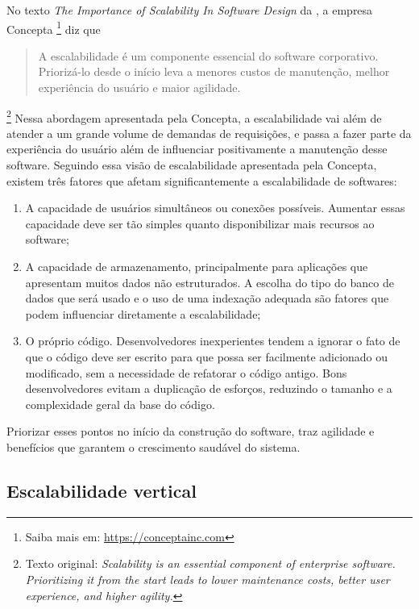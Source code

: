 No texto \textit{The Importance of Scalability In Software Design}
da , a empresa Concepta
\footnote{Saiba mais em: \url{https://conceptainc.com}} diz que \begin{quote}
A escalabilidade é um componente essencial do software corporativo. Priorizá-lo
desde o início leva a menores custos de manutenção, melhor experiência do usuário
e maior agilidade.\end{quote}\footnote{Texto original: \textit{Scalability is an
essential component of enterprise software. Prioritizing it from the start leads
to lower maintenance costs, better user experience, and higher agility.}} Nessa
abordagem apresentada pela Concepta, a escalabilidade vai além de atender a um
grande volume de demandas de requisições, e passa a fazer parte da experiência
do usuário além de influenciar positivamente a manutenção desse software. Seguindo
essa visão de escalabilidade apresentada pela Concepta, existem três fatores que
afetam significantemente a escalabilidade de softwares:

  \begin{enumerate}
    \item A capacidade de usuários simultâneos ou conexões possíveis.
    Aumentar essas capacidade deve ser tão simples quanto disponibilizar mais
    recursos ao software;
    \item A capacidade de armazenamento, principalmente para aplicações
    que apresentam muitos dados não estruturados. A escolha do tipo do banco de
    dados que será usado e o uso de uma indexação adequada são fatores que
    podem influenciar diretamente a escalabilidade;
    \item O próprio código. Desenvolvedores inexperientes tendem a ignorar
    o fato de que o código deve ser escrito para que possa ser facilmente
    adicionado ou modificado, sem a necessidade de refatorar o código antigo.
    Bons desenvolvedores evitam a duplicação de esforços, reduzindo o tamanho
    e a complexidade geral da base do código.
  \end{enumerate}

Priorizar esses pontos no início da construção do software, traz agilidade e
benefícios que garantem o crescimento saudável do sistema.

\subsection{Escalabilidade vertical}

